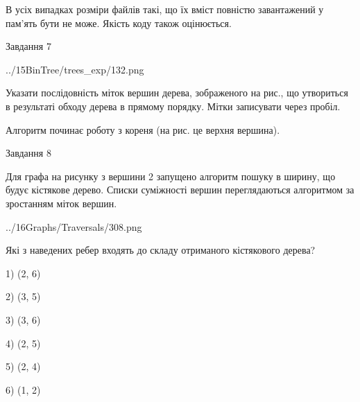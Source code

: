 \documentclass[12pt, ukrainian]{article}
\begin{document}
{В усіх випадках розміри файлів такі, що їх вміст повністю завантажений у пам'ять бути не може. Якість коду також оцінюється.



\vspace{10mm}\par

\newpage
\begin{minipage}[t]{9.7cm}
               
{\begin{center}Завдання {7}\end{center}}
\vspace{-4mm}

\begin{center}
	{../15BinTree/trees_exp/132.png}
\end{center}
Указати послідовність міток вершин дерева, зображеного на рис., що утвориться в результаті обходу дерева в прямому порядку. Мітки записувати через пробіл.\par Алгоритм починає роботу з кореня (на рис. це верхня вершина).\par

\end{minipage}
\vline \hspace{8mm}
\begin{minipage}[t]{8.0cm}
               
{\begin{center}Завдання {8}\end{center}}
\vspace{-4mm}
Для графа на рисунку з вершини 2 запущено алгоритм пошуку в ширину, що будує кістякове дерево. Списки суміжності вершин переглядаються алгоритмом за зростанням міток вершин.\par
\begin{center}
	{../16Graphs/Traversals/308.png}
\end{center}
\par Які з наведених ребер входять до складу отриманого кістякового дерева?\par
1) (2, 6)\par
2) (3, 5)\par
3) (3, 6)\par
4) (2, 5)\par
5) (2, 4)\par
6) (1, 2)\par
{\vskip 15pt} \par


\end{minipage}}
\end{document}
